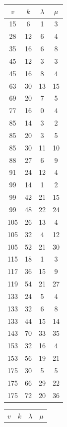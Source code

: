 \documentclass[12pt]{amsproc} %
\theoremstyle{definition}\newtheorem{defn}[thm]{Definition}
\theoremstyle{definition}\newtheorem{rem}[thm]{Remark}
\theoremstyle{definition}\newtheorem{ex}[thm]{Example}
\begin{document}
\begin{table}[ht!]
    \centering
    \begin{minipage}{0.25\textwidth}
        \centering
        \begin{tabular}{c|c|c|c}
            $v$ & $k$ & $\lambda$ & $\mu$ \\ 
            \hline
      15&6&1&3\\ 
      28&12&6&4\\ 
      35&16&6&8\\ 
      45&12&3&3\\ 
      45&16&8&4\\ 
      63&30&13&15\\ 
      69&20&7&5\\ 
      77&16&0&4\\ 
      85&14&3&2\\ 
      85&20&3&5\\ 
      85&30&11&10\\ 
      88&27&6&9\\ 
      91&24&12&4\\ 
      99&14&1&2\\ 
      99&42&21&15\\ 
      99&48&22&24\\ 
      105&26&13&4\\ 
      105&32&4&12\\ 
      105&52&21&30\\ 
      115&18&1&3\\ 
      117&36&15&9\\ 
      119&54&21&27\\ 
      133&24&5&4\\ 
      133&32&6&8\\ 
      133&44&15&14\\ 
      143&70&33&35\\ 
      153&32&16&4\\ 
      153&56&19&21\\ 
      175&30&5&5\\ 
      175&66&29&22\\ 
      175&72&20&36\\ 
        \end{tabular}
    \end{minipage}
    \hfill
    \begin{minipage}{0.25\textwidth}
        \centering
        \begin{tabular}{c|c|c|c}
            $v$ & $k$ & $\lambda$ & $\mu$ \\ 

\end{tabular}
\end{minipage}
\end{table}
\end{document}
